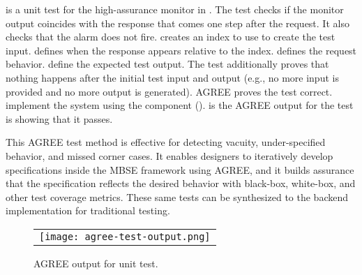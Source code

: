  is a unit test for the high-assurance monitor in .
The test checks if the monitor output coincides with the response that comes one step after the request.
It also checks that the alarm does not fire.
 creates an index to use to create the test input.
 defines when the response appears relative to the index.
 defines the request behavior.
 define the expected test output.
The test additionally proves that nothing happens after the initial test input and output (e.g., no more input is provided and no more output is generated).
AGREE proves the test correct.
 implement the system using the component ().
 is the AGREE output for the test is showing that it passes. 

This AGREE test method is effective for detecting vacuity, under-specified behavior, and missed corner cases.
It enables designers to iteratively develop specifications inside the MBSE framework using AGREE, and it builds assurance that the specification reflects the desired behavior with black-box, white-box, and other test coverage metrics.
These same tests can be synthesized to the backend implementation for traditional testing.

\begin{figure}
  \begin{center}
    \begin{tabular}{c}
      \texttt{[image: agree-test-output.png]} \\
    \end{tabular}
  \end{center}
  \caption{AGREE output for unit test.} 
  \label{fig:test-output}
\end{figure}